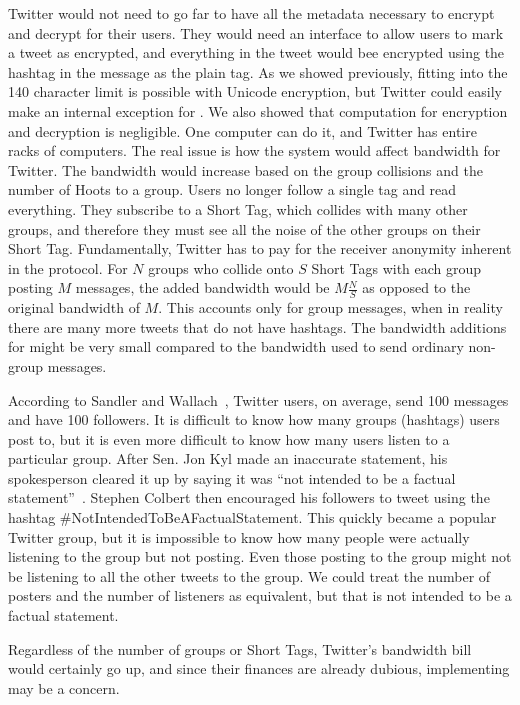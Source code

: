 Twitter would not need to go far to have all the metadata necessary to encrypt and decrypt for their users. They would need an interface to allow users to mark a tweet as encrypted, and everything in the tweet would bee encrypted using the hashtag in the message as the plain tag. As we showed previously, fitting into the 140 character limit is possible with Unicode encryption, but Twitter could easily make an internal exception for \hoot. We also showed that computation for encryption and decryption is negligible. One computer can do it, and Twitter has entire racks of computers. The real issue is how the \hoot system would affect bandwidth for Twitter. The bandwidth would increase based on the group collisions and the number of Hoots to a group. Users no longer follow a single tag and read everything. They subscribe to a Short Tag, which collides with many other groups, and therefore they must see all the noise of the other groups on their Short Tag. Fundamentally, Twitter has to pay for the receiver anonymity inherent in the \hoot protocol. 
For $N$ groups who collide onto $S$ Short Tags with each group posting $M$ messages, the added bandwidth would be $M\frac{N}{S}$ as opposed to the original bandwidth of $M$. This accounts only for group messages, when in reality there are many more tweets that do not have hashtags. The bandwidth additions for \hoot might be very small compared to the bandwidth used to send ordinary non-group messages.

According to Sandler and Wallach~\cite{sandler09}, Twitter users, on average, send 100 messages and have 100 followers. It is difficult to know how many groups (hashtags) users post to, but it is even more difficult to know how many users listen to a particular group. After Sen. Jon Kyl made an inaccurate statement, his spokesperson cleared it up by saying it was ``not intended to be a factual statement''~\cite{politico11}. Stephen Colbert then encouraged his followers to tweet using the hashtag \#NotIntendedToBeAFactualStatement. This quickly became a popular Twitter group, but it is impossible to know how many people were actually listening to the group but not posting. Even those posting to the group might not be listening to all the other tweets to the group. We could treat the number of posters and the number of listeners as equivalent, but that is not intended to be a factual statement.

Regardless of the number of groups or Short Tags, Twitter's bandwidth bill would certainly go up, and since their finances are already dubious, implementing \hoot may be a concern.

